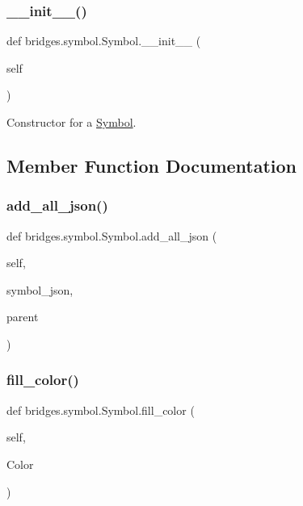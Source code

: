 \subsubsection{\texorpdfstring{\+\_\+\+\_\+init\+\_\+\+\_\+()}{\_\_init\_\_()}}
{\footnotesize\ttfamily def bridges.\+symbol.\+Symbol.\+\_\+\+\_\+init\+\_\+\+\_\+ (\begin{DoxyParamCaption}\item[{}]{self }\end{DoxyParamCaption})}



Constructor for a \hyperlink{classbridges_1_1symbol_1_1_symbol}{Symbol}. 



\subsection{Member Function Documentation}
\mbox{\label{classbridges_1_1symbol_1_1_symbol_aebfb998c2550502c8a20dfba371f0b19}} 
\subsubsection{\texorpdfstring{add\+\_\+all\+\_\+json()}{add\_all\_json()}}
{\footnotesize\ttfamily def bridges.\+symbol.\+Symbol.\+add\+\_\+all\+\_\+json (\begin{DoxyParamCaption}\item[{}]{self,  }\item[{}]{symbol\+\_\+json,  }\item[{}]{parent }\end{DoxyParamCaption})}

\mbox{\label{classbridges_1_1symbol_1_1_symbol_a1a5e9147e426fb7ec74fe60a5cdc9ded}} 
\subsubsection{\texorpdfstring{fill\+\_\+color()}{fill\_color()}\hspace{0.1cm}{\footnotesize\ttfamily [1/2]}}
{\footnotesize\ttfamily def bridges.\+symbol.\+Symbol.\+fill\+\_\+color (\begin{DoxyParamCaption}\item[{}]{self,  }\item[{}]{Color }\end{DoxyParamCaption})}



